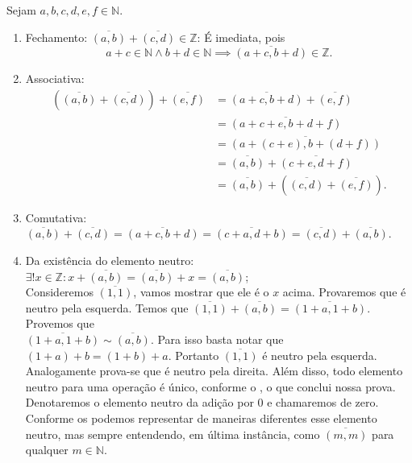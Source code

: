 \documentclass[../main.tex]{subfiles}
\begin{document}
\begin{dem}
    Sejam $a,b,c,d,e,f \in  \mathbb{N}$.
    \begin{enumerate}[label=(\roman*)]
        \item Fechamento: $\overline{(a,b)} + \overline{(c,d)} \in \mathbb{Z}$:
        É imediata, pois \[ a+c \in \mathbb{N} \land b+d \in \mathbb{N} \implies \overline{(a+c,b+d)} \in \mathbb{Z}. \]

        \item Associativa: 
        \begin{align*}
            \left(\overline{(a,b)} + \overline{(c,d)}\right) +  \overline{(e,f)} 
            &= \overline{(a+c,b+d)}+\overline{(e,f)} \\ 
            &= \overline{(a+c+e, b+d+f)} \\
            &= \overline{ \left( a+(c+e), b+(d+f) \right) } \\
            &= \overline{(a,b)} + \overline{ (c+e, d+f) } \\
            &= \overline{(a,b)} + \left( \overline{(c,d)} + \overline{(e,f)} \right).
        \end{align*}
       
        \item Comutativa: $\overline{(a,b)} + \overline{(c,d)} = \overline{(a+c,b+d)} = \overline{(c+a,d+b)} = \overline{(c,d)} + \overline{(a,b)}$.
       
        \item Da existência do elemento neutro: $\exists! x \in \mathbb{Z} : x + \overline{(a,b)} = \overline{(a,b)} + x = \overline{(a,b)}$; \\
        Consideremos $\overline{(1,1)}$, vamos mostrar que ele é o $x$ acima. 
        Provaremos que é neutro pela esquerda. Temos que $\overline{(1,1)} + \overline{(a,b)} = \overline{(1+a,1+b)}$. Provemos que  \\ $\overline{(1+a,1+b)} \sim \overline{(a,b)}$.
        Para isso basta notar que $(1+a)+b = (1+b)+a$. Portanto $\overline{(1,1)}$ é neutro pela esquerda. Analogamente prova-se que é neutro pela direita. Além disso, todo elemento neutro para uma operação é único, conforme o , o que conclui nossa prova. Denotaremos o elemento neutro da adição por $0$ e chamaremos de zero. Conforme os  podemos representar de maneiras diferentes esse elemento neutro, mas sempre entendendo, em última instância, como $\overline{(m,m)}$ para qualquer $m \in \mathbb{N}$.
       

\end{enumerate}
\end{dem}
\end{document}
